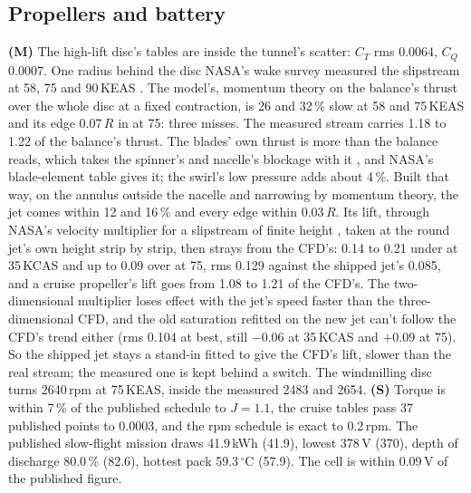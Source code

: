 \documentclass[10pt,a4paper,twocolumn]{article}
\begin{document}
\subsection{Propellers and battery}
\textbf{(M)} The high-lift disc's tables are inside the tunnel's scatter: $C_T$ rms 0.0064, $C_Q$ 0.0007. One radius behind the disc NASA's wake survey measured the slipstream at 58, 75 and 90\,KEAS \cite{tun2}. The model's, momentum theory on the balance's thrust over the whole disc at a fixed contraction, is 26 and 32\,\% slow at 58 and 75\,KEAS and its edge 0.07\,$R$ in at 75: three misses. The measured stream carries 1.18 to 1.22 of the balance's thrust. The blades' own thrust is more than the balance reads, which takes the spinner's and nacelle's blockage with it \cite{tun2}, and NASA's blade-element table gives it; the swirl's low pressure adds about 4\,\%. Built that way, on the annulus outside the nacelle and narrowing by momentum theory, the jet comes within 12 and 16\,\% and every edge within 0.03\,$R$. Its lift, through NASA's velocity multiplier for a slipstream of finite height \cite{pdb}, taken at the round jet's own height strip by strip, then strays from the CFD's: 0.14 to 0.21 under at 35\,KCAS and up to 0.09 over at 75, rms 0.129 against the shipped jet's 0.085, and a cruise propeller's lift goes from 1.08 to 1.21 of the CFD's. The two-dimensional multiplier loses effect with the jet's speed faster than the three-dimensional CFD, and the old saturation refitted on the new jet can't follow the CFD's trend either (rms 0.104 at best, still $-0.06$ at 35\,KCAS and $+0.09$ at 75). So the shipped jet stays a stand-in fitted to give the CFD's lift, slower than the real stream; the measured one is kept behind a switch. The windmilling disc turns 2640\,rpm at 75\,KEAS, inside the measured 2483 and 2654. \textbf{(S)} Torque is within 7\,\% of the published schedule to $J=1.1$, the cruise tables pass 37 published points to 0.0003, and the rpm schedule is exact to 0.2\,rpm. The published slow-flight mission draws 41.9\,kWh (41.9), lowest 378\,V (370), depth of discharge 80.0\,\% (82.6), hottest pack 59.3\,$^\circ$C (57.9). The cell is within 0.09\,V of the published figure.
\end{document}
